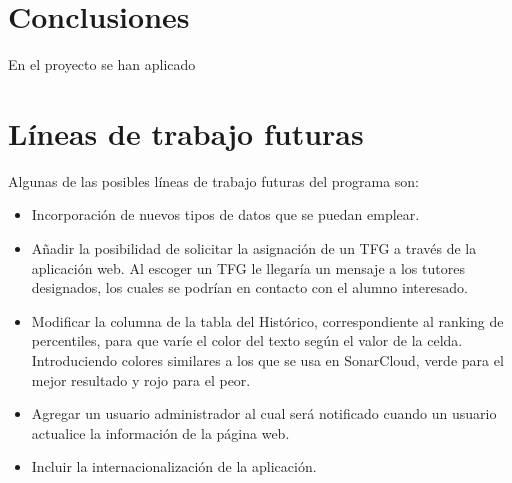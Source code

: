 
\section{Conclusiones}
En el proyecto se han aplicado 

\section{Líneas de trabajo futuras}
Algunas de las posibles líneas de trabajo futuras del programa son:
\begin{itemize}
	\item Incorporación de nuevos tipos de datos que se puedan emplear. 
	\item Añadir la posibilidad de solicitar la asignación de un TFG a través de la aplicación web. Al escoger un TFG le llegaría un mensaje a los tutores designados, los cuales se podrían en contacto con el alumno interesado. 
	\item Modificar la columna de la tabla del Histórico, correspondiente al ranking de percentiles, para que varíe el color del texto según el valor de la celda. Introduciendo colores similares a los que se usa en SonarCloud, verde para el mejor resultado y rojo para el peor.
	\item Agregar un usuario administrador al cual será notificado cuando un usuario actualice la información de la página web.
	\item Incluir la internacionalización de la aplicación.
\end{itemize}